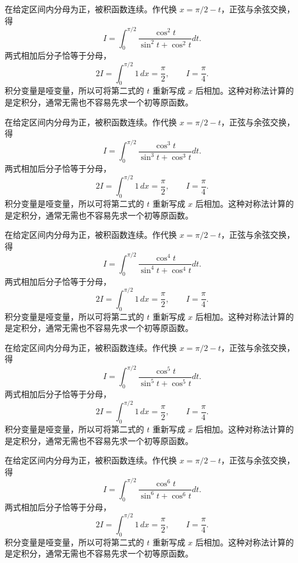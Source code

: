 \documentclass[UTF8,12pt,a4paper,fontset=fandol]{ctexart}
\begin{document}
\begin{solve}\label{ans:c17q22}
在给定区间内分母为正，被积函数连续。作代换 $x=\pi/2-t$，正弦与余弦交换，得
\[
I=\int_0^{\pi/2}\frac{\cos^{2}t}{\sin^{2}t+\cos^{2}t}dt.
\]
两式相加后分子恰等于分母，
\[
2I=\int_0^{\pi/2}1\,dx=\frac\pi2,\qquad I=\frac\pi4.
\]
积分变量是哑变量，所以可将第二式的 $t$ 重新写成 $x$ 后相加。这种对称法计算的是定积分，通常无需也不容易先求一个初等原函数。
\end{solve}

\begin{solve}\label{ans:c17q23}
在给定区间内分母为正，被积函数连续。作代换 $x=\pi/2-t$，正弦与余弦交换，得
\[
I=\int_0^{\pi/2}\frac{\cos^{3}t}{\sin^{3}t+\cos^{3}t}dt.
\]
两式相加后分子恰等于分母，
\[
2I=\int_0^{\pi/2}1\,dx=\frac\pi2,\qquad I=\frac\pi4.
\]
积分变量是哑变量，所以可将第二式的 $t$ 重新写成 $x$ 后相加。这种对称法计算的是定积分，通常无需也不容易先求一个初等原函数。
\end{solve}

\begin{solve}\label{ans:c17q24}
在给定区间内分母为正，被积函数连续。作代换 $x=\pi/2-t$，正弦与余弦交换，得
\[
I=\int_0^{\pi/2}\frac{\cos^{4}t}{\sin^{4}t+\cos^{4}t}dt.
\]
两式相加后分子恰等于分母，
\[
2I=\int_0^{\pi/2}1\,dx=\frac\pi2,\qquad I=\frac\pi4.
\]
积分变量是哑变量，所以可将第二式的 $t$ 重新写成 $x$ 后相加。这种对称法计算的是定积分，通常无需也不容易先求一个初等原函数。
\end{solve}

\begin{solve}\label{ans:c17q25}
在给定区间内分母为正，被积函数连续。作代换 $x=\pi/2-t$，正弦与余弦交换，得
\[
I=\int_0^{\pi/2}\frac{\cos^{5}t}{\sin^{5}t+\cos^{5}t}dt.
\]
两式相加后分子恰等于分母，
\[
2I=\int_0^{\pi/2}1\,dx=\frac\pi2,\qquad I=\frac\pi4.
\]
积分变量是哑变量，所以可将第二式的 $t$ 重新写成 $x$ 后相加。这种对称法计算的是定积分，通常无需也不容易先求一个初等原函数。
\end{solve}

\begin{solve}\label{ans:c17q26}
在给定区间内分母为正，被积函数连续。作代换 $x=\pi/2-t$，正弦与余弦交换，得
\[
I=\int_0^{\pi/2}\frac{\cos^{6}t}{\sin^{6}t+\cos^{6}t}dt.
\]
两式相加后分子恰等于分母，
\[
2I=\int_0^{\pi/2}1\,dx=\frac\pi2,\qquad I=\frac\pi4.
\]
积分变量是哑变量，所以可将第二式的 $t$ 重新写成 $x$ 后相加。这种对称法计算的是定积分，通常无需也不容易先求一个初等原函数。
\end{solve}
\end{document}
